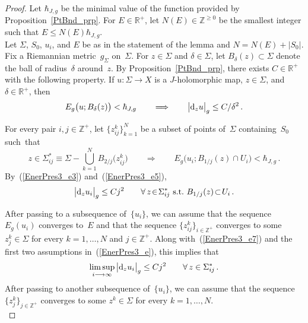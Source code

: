 \documentclass[11pt]{article}
\numberwithin{equation}{section}
\theoremstyle{definition}
\def\BE#1{\begin{equation}\label{#1}}
\def\EE{\end{equation}}
\def\eref#1{(\ref{#1})}
\def\lra{\longrightarrow}
\def\Lra{\Longrightarrow}
\def\R{\mathbb R}
\def\Z{{\mathbb Z}}
\def\de{\delta}
\def\Si{\Sigma}
\def\i{\infty}
\def\hb{\hbar}
\def\nd{\textnormal{d}}
\begin{document}
\begin{proof}
Let $\hb_{J,g}$ be the minimal value of the function provided by Proposition~\ref{PtBnd_prp}.
For $E\!\in\!\R^+$, let $N(E)\!\in\!\Z^{\ge0}$ be the smallest integer
such that $E\!\le\!N(E)\hb_{J,g}$.\\

\noindent
Let $\Si$, $S_0$, $u_i$, and $E$ be as in the statement of the lemma and
$N\!=\!N(E)\!+\!|S_0|$.
Fix a Riemannian metric~$g_{\Si}$ on~$\Si$.
For $z\!\in\!\Si$ and $\de\!\in\!\Si$, 
let $B_{\de}(z)\!\subset\!\Si$ denote the ball of radius~$\de$  around~$z$.
By Proposition~\ref{PtBnd_prp}, there exists $C\!\in\!\R^+$ with the following property.
If $u\!:\Si\!\lra\!X$ is a $J$-holomorphic map, $z\!\in\!\Si$, and $\de\!\in\!\R^+$,
then
\BE{EnerPres3_e3}  E_g\big(u;B_{\de}(z)\big)<\hb_{J,g} \qquad\Lra\qquad
\big|\nd_zu\big|_g\le C/\de^2\,.\EE 

\vspace{.1in}

\noindent
For every pair $i,j\!\in\!\Z^+$, 
let $\{z_{ij}^k\}_{k=1}^N$ be a subset of points of~$\Si$ containing~$S_0$ 
such~that
\BE{EnerPres3_e5} z\in \Si_{ij}^*\equiv\Si\!-\!\bigcup_{k=1}^N\!B_{2/j}\big(z_{ij}^k\big)
 \qquad\Lra\qquad
E_g\big(u_i;B_{1/j}(z)\!\cap\!U_i\big)<\hb_{J,g}\,.\EE
By~\eref{EnerPres3_e3} and~\eref{EnerPres3_e5},
\BE{EnerPres3_e7} 
\big|\nd_zu_i\big|_g\le Cj^2 \qquad\forall\,z\!\in\!\Si_{ij}^*
~\hbox{s.t.}~B_{1/j}(z)\!\subset\!U_i\,.\EE

\vspace{.1in}

\noindent
After passing to a subsequence of~$\{u_i\}$, we can assume that 
the sequence $E_g(u_i)$ converges to~$E$ and
that the sequence 
$\{z_{ij}^k\}_{i\in\Z^+}$ converges to some $z_j^k\!\in\!\Si$ for every 
$k\!=\!1,\ldots,N$ and $j\!\in\!\Z^+$.
Along with~\eref{EnerPres3_e7} and 
the first two assumptions in~\eref{EnerPres3_e}, this implies that 
\BE{EnerPres3_e9} \limsup_{i\lra\i}\big|\nd_zu_i\big|_g\le Cj^2 
\qquad\forall\,z\in\Si_{ij}^*\,.\EE
After passing to another subsequence of~$\{u_i\}$, we can assume that the sequence 
$\{z_j^k\}_{j\in\Z^+}$ converges to some $z^k\!\in\!\Si$ for every 
$k\!=\!1,\ldots,N$.
\\


\end{proof}
\end{document}
